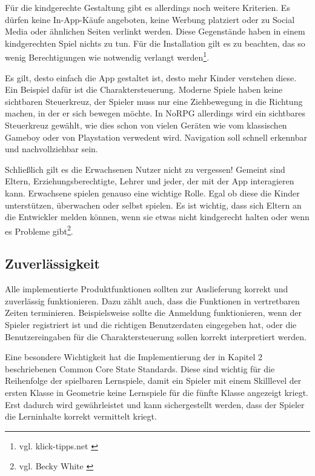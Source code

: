 		Für die kindgerechte Gestaltung gibt es allerdings noch weitere Kriterien. Es dürfen keine In-App-Käufe angeboten, keine Werbung platziert oder zu Social Media oder ähnlichen Seiten verlinkt werden. Diese Gegenstände haben in einem kindgerechten Spiel nichts zu tun. Für die Installation gilt es zu beachten, das so wenig Berechtigungen wie notwendig verlangt werden\footnote{vgl. klick-tipps.net \cite{appsforkids}}.
		
		Es gilt, desto einfach die App gestaltet ist, desto mehr Kinder verstehen diese. Ein Beispiel dafür ist die Charaktersteuerung. Moderne Spiele haben keine sichtbaren Steuerkreuz, der Spieler muss nur eine Ziehbewegung in die Richtung machen, in der er sich bewegen möchte. In NoRPG allerdings wird ein sichtbares Steuerkreuz gewählt, wie dies schon von vielen Geräten wie vom klassischen Gameboy oder von Playstation verwedent wird. Navigation soll schnell erkennbar und nachvollziehbar sein.
		
		Schließlich gilt es die Erwachsenen Nutzer nicht zu vergessen! Gemeint sind Eltern, Erziehungsberechtigte, Lehrer und jeder, der mit der App interagieren kann. Erwachsene spielen genauso eine wichtige Rolle. Egal ob diese die Kinder unterstützen, überwachen oder selbst spielen. Es ist wichtig, dass sich Eltern an die Entwickler melden können, wenn sie etwas nicht kindgerecht halten oder wenn es Probleme gibt\footnote{vgl. Becky White \cite{smashMagazin}}.	

	\subsection{Zuverlässigkeit}
		Alle implementierte Produktfunktionen sollten zur Auslieferung korrekt und zuverlässig funktionieren. Dazu zählt auch, dass die Funktionen in vertretbaren Zeiten terminieren. Beispielsweise sollte die Anmeldung funktionieren, wenn der Spieler registriert ist und die richtigen Benutzerdaten eingegeben hat, oder die Benutzereingaben für die Charaktersteuerung sollen korrekt interpretiert werden.
		
		Eine besondere Wichtigkeit hat die Implementierung der in Kapitel 2 beschriebenen Common Core State Standards. Diese sind wichtig für die Reihenfolge der spielbaren Lernspiele, damit ein Spieler mit einem Skilllevel der ersten Klasse in Geometrie keine Lernspiele für die fünfte Klasse angezeigt kriegt. Erst dadurch wird gewährleistet und kann sichergestellt werden, dass der Spieler die Lerninhalte korrekt vermittelt kriegt.
	
